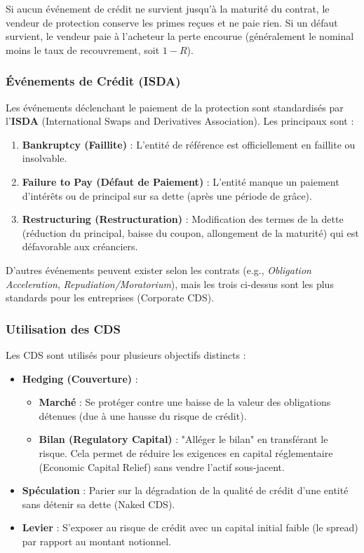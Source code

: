 Si aucun événement de crédit ne survient jusqu'à la maturité du contrat, le vendeur de protection conserve les primes reçues et ne paie rien. Si un défaut survient, le vendeur paie à l'acheteur la perte encourue (généralement le nominal moins le taux de recouvrement, soit $1-R$).

\subsubsection{Événements de Crédit (ISDA)}

Les événements déclenchant le paiement de la protection sont standardisés par l'\textbf{ISDA} (International Swaps and Derivatives Association). Les principaux sont :

\begin{enumerate}
    \item \textbf{Bankruptcy (Faillite)} : L'entité de référence est officiellement en faillite ou insolvable.
    \item \textbf{Failure to Pay (Défaut de Paiement)} : L'entité manque un paiement d'intérêts ou de principal sur sa dette (après une période de grâce).
    \item \textbf{Restructuring (Restructuration)} : Modification des termes de la dette (réduction du principal, baisse du coupon, allongement de la maturité) qui est défavorable aux créanciers.
\end{enumerate}

D'autres événements peuvent exister selon les contrats (e.g., \textit{Obligation Acceleration}, \textit{Repudiation/Moratorium}), mais les trois ci-dessus sont les plus standards pour les entreprises (Corporate CDS).

\subsubsection{Utilisation des CDS}

Les CDS sont utilisés pour plusieurs objectifs distincts :

\begin{itemize}
    \item \textbf{Hedging (Couverture)} :
    \begin{itemize}
        \item \textbf{Marché} : Se protéger contre une baisse de la valeur des obligations détenues (due à une hausse du risque de crédit).
        \item \textbf{Bilan (Regulatory Capital)} : "Alléger le bilan" en transférant le risque. Cela permet de réduire les exigences en capital réglementaire (Economic Capital Relief) sans vendre l'actif sous-jacent.
    \end{itemize}
    \item \textbf{Spéculation} : Parier sur la dégradation de la qualité de crédit d'une entité sans détenir sa dette (Naked CDS).
    \item \textbf{Levier} : S'exposer au risque de crédit avec un capital initial faible (le spread) par rapport au montant notionnel.
\end{itemize}


